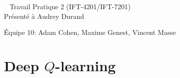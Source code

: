 \documentclass[letterpaper,11pt]{article}
\begin{document}
\begin{center}
~
\vfill
\LARGE{Travail Pratique 2 (IFT-4201/IFT-7201)}\\[0.4cm]

\Large{Présenté à Audrey Durand}

\vfill
\large{Équipe 10: Adam Cohen, Maxime Genest, Vincent Masse}

\vfill
\thispagestyle{empty}

\end{center}

\clearpage

\pagestyle{fancy}

\section{Deep $Q$-learning}
\end{document}

